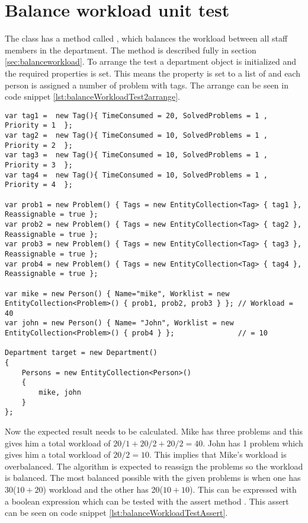 \section{Balance workload unit test}
\label{sec:balWorUniTes}
The  class has a method called , which balances the workload between all staff members in the department. 
The method is described fully in section \ref{sec:balanceworkload}. 
To arrange the test a department object is initialized and the required properties is set. This means the  property is set to a list of  and each person is assigned a number of problem with tags. 
The arrange can be seen in code snippet \ref{lst:balanceWorkloadTest2arrange}. 

\begin{lstlisting}[style=sourceCode, caption=\myCaption{The arrange phase of the unit test of balance workload}, label=lst:balanceWorkloadTest2arrange]
var tag1 =  new Tag(){ TimeConsumed = 20, SolvedProblems = 1 , Priority = 1  };  
var tag2 =  new Tag(){ TimeConsumed = 10, SolvedProblems = 1 , Priority = 2  }; 
var tag3 =  new Tag(){ TimeConsumed = 10, SolvedProblems = 1 , Priority = 3  }; 
var tag4 =  new Tag(){ TimeConsumed = 10, SolvedProblems = 1 , Priority = 4  }; 

var prob1 = new Problem() { Tags = new EntityCollection<Tag> { tag1 }, Reassignable = true };
var prob2 = new Problem() { Tags = new EntityCollection<Tag> { tag2 }, Reassignable = true };
var prob3 = new Problem() { Tags = new EntityCollection<Tag> { tag3 }, Reassignable = true };
var prob4 = new Problem() { Tags = new EntityCollection<Tag> { tag4 }, Reassignable = true };
   
var mike = new Person() { Name="mike", Worklist = new EntityCollection<Problem>() { prob1, prob2, prob3 } }; // Workload = 40
var john = new Person() { Name= "John", Worklist = new EntityCollection<Problem>() { prob4 } };               // = 10

Department target = new Department()
{
    Persons = new EntityCollection<Person>()
    {
        mike, john
    }
};
\end{lstlisting}

Now the expected result needs to be calculated. 
Mike has three problems and this gives him a total workload of $20/1 + 20/2 + 20/2 = 40$. 
John has 1 problem which gives him a total workload of $20 / 2 = 10$. 
This implies that Mike's workload is overbalanced. 
The algorithm is expected to reassign the problems so the workload is balanced. 
The most balanced possible with the given problems is when one has 30($10 + 20$) workload and the other has 20($10 + 10$). 
This can be expressed with a boolean expression which can be tested with the assert method . 
This assert can be seen on code snippet \ref{lst:balanceWorkloadTestAssert}.

